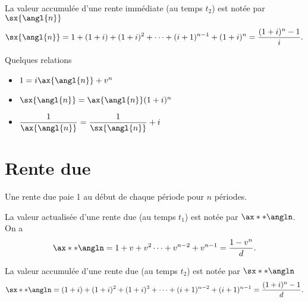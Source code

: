 La valeur accumulée d'une rente immédiate (au temps \textcolor{dlblue}{$t_2$}) est notée par $\sx{\angl{n}}$
$$\sx{\angl{n}} = 1 + (1+i) + (1+i)^2+ \dots + (i+1)^{n-1} + (1+i)^n = \frac{(1+i)^n - 1}{i}.$$

Quelques relations 
\begin{multicols}{3}
	\begin{itemize}
		\item $1 = i\ax{\angl{n}} + v^n$
		\item $\sx{\angl{n}} = \ax{\angl{n}} (1+i)^n$
		\item $\displaystyle \frac{1}{\ax{\angl{n}}} = \frac{1}{\sx{\angl{n}}} + i$
	\end{itemize}
\end{multicols}

\section{Rente due}

Une rente due paie 1 au début de chaque période pour $n$ périodes. 

\begin{center}
\end{center}

La valeur actualisée d'une rente due (au temps \textcolor{dlblue}{$t_1$}) est notée par $\ax**{\angln}$. On a 
$$\ax**{\angln} = 1 + v + v^2 \dots + v^{n-2} + v^{n-1} = \frac{1 - v^n}{d}.$$

La valeur accumulée d'une rente due (au temps \textcolor{dlblue}{$t_2$}) est notée par $\sx**{\angln}$
$$\sx**{\angln} = (1+i) + (1+i)^2 + (1+i)^3 + \dots + (i+1)^{n-2} + (i+1)^{n-1} = \frac{(1+i)^n - 1}{d}.$$

